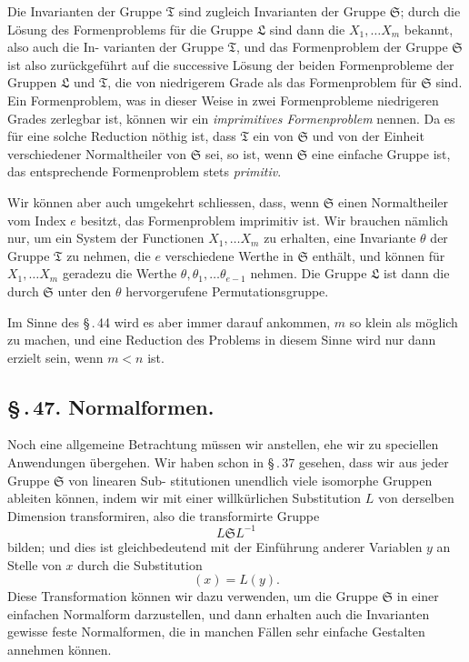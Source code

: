 \documentclass[12pt,a4paper]{article}
\theoremstyle{plain}
\theoremstyle{definition}
\theoremstyle{remark}
\newcommand{\sect}[1]{\S\,.\,#1.}
\begin{document}
Die Invarianten der Gruppe $\mathfrak{T}$ sind zugleich Invarianten
der Gruppe $\mathfrak{S}$; durch die L\"osung des Formenproblems f\"ur die
Gruppe $\mathfrak{L}$ sind dann die $X_1, \ldots X_m$ bekannt, also auch die In-
varianten der Gruppe $\mathfrak{T}$, und das Formenproblem der Gruppe $\mathfrak{S}$
ist also zur\"uckgef\"uhrt auf die successive L\"osung der beiden
Formenprobleme der Gruppen $\mathfrak{L}$ und $\mathfrak{T}$, die von niedrigerem
Grade als das Formenproblem f\"ur $\mathfrak{S}$ sind. Ein Formenproblem,
was in dieser Weise in zwei Formenprobleme niedrigeren Grades
zerlegbar ist, k\"onnen wir ein \emph{imprimitives Formenproblem}
nennen. Da es f\"ur eine solche Reduction n\"othig ist, dass $\mathfrak{T}$ ein
von $\mathfrak{S}$ und von der Einheit verschiedener Normaltheiler von $\mathfrak{S}$
sei, so ist, wenn $\mathfrak{S}$ eine einfache Gruppe ist, das entsprechende
Formenproblem stets \emph{primitiv}.

Wir k\"onnen aber auch umgekehrt schliessen, dass, wenn $\mathfrak{S}$
einen Normaltheiler vom Index $e$ besitzt, das Formenproblem
imprimitiv ist. Wir brauchen n\"amlich nur, um ein System der
Functionen $X_1, \ldots X_m$ zu erhalten, eine Invariante $\theta$ der Gruppe
$\mathfrak{T}$ zu nehmen, die $e$ verschiedene Werthe in $\mathfrak{S}$ enth\"alt, und
k\"onnen f\"ur $X_1, \ldots X_m$ geradezu die Werthe $\theta, \theta_1, \ldots \theta_{e-1}$
nehmen. Die Gruppe $\mathfrak{L}$ ist dann die durch $\mathfrak{S}$ unter den $\theta$
hervorgerufene Permutationsgruppe.

Im Sinne des \S\,.\,44 wird es aber immer darauf ankommen,
$m$ so klein als m\"oglich zu machen, und eine Reduction des
Problems in diesem Sinne wird nur dann erzielt sein, wenn
$m < n$ ist.


\subsection*{\sect{47} Normalformen.}

Noch eine allgemeine Betrachtung m\"ussen wir anstellen, ehe
wir zu speciellen Anwendungen \"ubergehen. Wir haben schon in
\S\,.\,37 gesehen, dass wir aus jeder Gruppe $\mathfrak{S}$ von linearen Sub-
stitutionen unendlich viele isomorphe Gruppen ableiten k\"onnen,
indem wir mit einer willk\"urlichen Substitution $L$ von derselben
Dimension transformiren, also die transformirte Gruppe
\begin{equation}\label{eq:47_1}
L\mathfrak{S}L^{-1}\tag{1}
\end{equation}
bilden; und dies ist gleichbedeutend mit der Einf\"uhrung anderer
Variablen $y$ an Stelle von $x$ durch die Substitution
\begin{equation}\label{eq:47_2}
(x) = L(y).\tag{2}
\end{equation}
Diese Transformation k\"onnen wir dazu verwenden, um die
Gruppe $\mathfrak{S}$ in einer einfachen Normalform darzustellen, und dann
erhalten auch die Invarianten gewisse feste Normalformen, die
in manchen F\"allen sehr einfache Gestalten annehmen k\"onnen.
\end{document}
